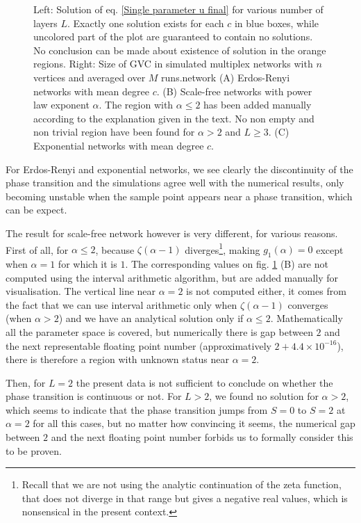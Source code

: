 \documentclass[
11pt, %
american, %
singlespacing, %
final, %
nolistspacing, %
liststotoc, %
headsepline, %
]{MastersDoctoralThesis} %
\begin{document}
{\begin{figure}
	\caption{Left: Solution of eq. \eqref{Single parameter u final} for various number of layers $L$. Exactly one solution exists for each $c$ in blue boxes, while uncolored part of the plot are guaranteed to contain no solutions. No conclusion can be made about existence of solution in the orange regions. Right: Size of GVC in simulated multiplex networks with $n$ vertices and averaged over $M$ runs.network (A) Erdos-Renyi networks with mean degree $c$. (B) Scale-free networks with power law exponent $\alpha$. The region with $\alpha \leq 2$ has been added manually according to the explanation given in the text. No non empty and non trivial region have been found for $\alpha > 2$ and $L \geq 3$. (C) Exponential networks with mean degree $c$.}
	\label{Figure: Multilayer single parameter}
\end{figure}
}

For Erdos-Renyi and exponential networks, we see clearly the discontinuity of the phase transition and the simulations agree well with the numerical results, only becoming unstable when the sample point appears near a phase transition, which can be expect.

The result for scale-free network however is very different, for various reasons. First of all, for $\alpha \leq 2$, because $\zeta(\alpha - 1)$ diverges\footnote{Recall that we are not using the analytic continuation of the zeta function, that does not diverge in that range but gives a negative real values, which is nonsensical in the present context.}, making $g_1(\alpha) = 0$ except when $\alpha = 1$ for which it is $1$. The corresponding values on fig. \ref{Figure: Multilayer single parameter} (B) are not computed using the interval arithmetic algorithm, but are added manually for visualisation. The vertical line near $\alpha = 2$ is not computed either, it comes from the fact that we can use interval arithmetic only when $\zeta(\alpha - 1)$ converges (when $\alpha > 2$) and we have an analytical solution only if $\alpha \leq 2$. Mathematically all the parameter space is covered, but numerically there is gap between $2$ and the next representable floating point number (approximatively $2 + 4.4 \times 10^{-16}$), there is therefore a region with unknown status near $\alpha = 2$.

Then, for $L = 2$ the present data is not sufficient to conclude on whether the phase transition is continuous or not. For $L > 2$, we found no solution for $\alpha > 2$, which seems to indicate that the phase transition jumps from $S = 0$ to $S = 2$ at $\alpha = 2$ for all this cases, but no matter how convincing it seems, the numerical gap between $2$ and the next floating point number forbids us to formally consider this to be proven.
\end{document}
